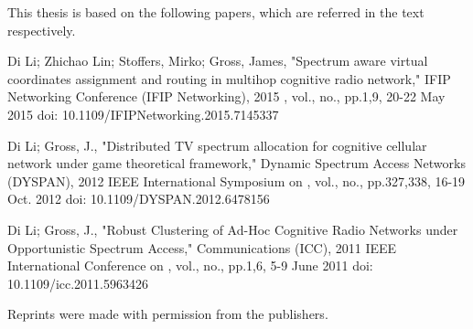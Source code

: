 This thesis is based on the following papers, which  are referred in the text respectively.

Di Li; Zhichao Lin; Stoffers, Mirko; Gross, James, "Spectrum aware virtual coordinates assignment and routing in multihop cognitive radio network," IFIP Networking Conference (IFIP Networking), 2015 , vol., no., pp.1,9, 20-22 May 2015
doi: 10.1109/IFIPNetworking.2015.7145337

Di Li; Gross, J., "Distributed TV spectrum allocation for cognitive cellular network under game theoretical framework," Dynamic Spectrum Access Networks (DYSPAN), 2012 IEEE International Symposium on , vol., no., pp.327,338, 16-19 Oct. 2012
doi: 10.1109/DYSPAN.2012.6478156

Di Li; Gross, J., "Robust Clustering of Ad-Hoc Cognitive Radio Networks under Opportunistic Spectrum Access," Communications (ICC), 2011 IEEE International Conference on , vol., no., pp.1,6, 5-9 June 2011
doi: 10.1109/icc.2011.5963426


Reprints were made with permission from the publishers.